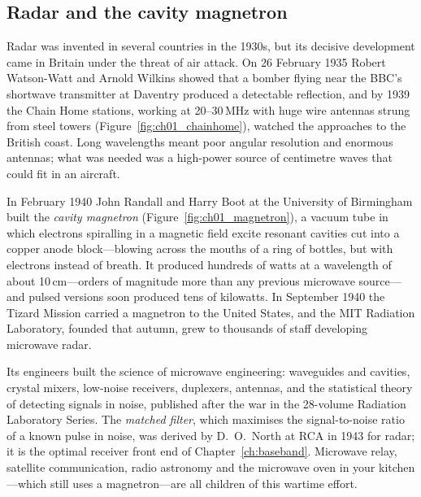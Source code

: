 \subsection{Radar and the cavity magnetron}
\label{sec:ch01:radar}

Radar was invented in several countries in the 1930s, but its decisive development came in Britain
under the threat of air attack. On 26 February 1935 Robert Watson-Watt and Arnold Wilkins showed that
a bomber flying near the BBC's shortwave transmitter at Daventry produced a detectable reflection, and
by 1939 the Chain Home stations, working at 20--30\,MHz with huge wire antennas strung from steel
towers (Figure~\ref{fig:ch01_chainhome}), watched the approaches to the British coast. Long wavelengths
meant poor angular resolution and enormous antennas; what was needed was a high-power source of
centimetre waves that could fit in an aircraft.


In February 1940 John Randall and Harry Boot at the University of Birmingham built the \emph{cavity
magnetron} (Figure~\ref{fig:ch01_magnetron}), a vacuum tube in which electrons
spiralling in a magnetic field excite resonant cavities cut into a copper anode block---blowing across
the mouths of a ring of bottles, but with electrons instead of breath. It produced hundreds of watts at
a wavelength of about 10\,cm---orders of magnitude more than any previous microwave source---and pulsed
versions soon produced tens of kilowatts. In September 1940 the Tizard Mission carried a magnetron to
the United States, and the MIT Radiation Laboratory, founded that autumn, grew to thousands of staff
developing microwave radar.

Its engineers built the science of microwave engineering: waveguides and cavities, crystal mixers,
low-noise receivers, duplexers, antennas, and the statistical theory of detecting signals in noise,
published after the war in the 28-volume Radiation Laboratory Series. The \emph{matched
filter}, which maximises the signal-to-noise ratio of a known pulse in noise, was
derived by D.~O.~North at RCA in 1943 for radar; it is the optimal receiver front end of
Chapter~\ref{ch:baseband}. Microwave relay, satellite communication, radio astronomy and the microwave
oven in your kitchen---which still uses a magnetron---are all children of this wartime effort.

